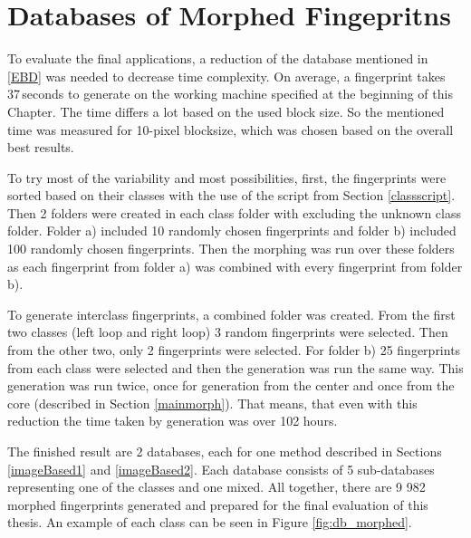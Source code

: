 \section{Databases of Morphed Fingepritns}
\label{database_morphed}
To evaluate the final applications, a reduction of the database mentioned in \ref{EBD} was needed to decrease time complexity. On average, a fingerprint takes 37\,seconds to generate on the working machine specified at the beginning of this Chapter. The time differs a lot based on the used block size. So the mentioned time was measured for 10-pixel blocksize, which was chosen based on the overall best results.

To try most of the variability and most possibilities, first, the fingerprints were sorted based on their classes with the use of the script from Section \ref{classscript}. Then 2 folders were created in each class folder with excluding the unknown class folder. Folder a) included 10 randomly chosen fingerprints and folder b) included 100 randomly chosen fingerprints. Then the morphing was run over these folders as each fingerprint from folder a) was combined with every fingerprint from folder b).

To generate interclass fingerprints, a combined folder was created. From the first two classes (left loop and right loop) 3 random fingerprints were selected. Then from the other two, only 2 fingerprints were selected. For folder b) 25 fingerprints from each class were selected and then the generation was run the same way. This generation was run twice, once for generation from the center and once from the core (described in Section \ref{mainmorph}). That means, that even with this reduction the time taken by generation was over 102 hours.

The finished result are 2 databases, each for one method described in Sections \ref{imageBased1} and \ref{imageBased2}. Each database consists of 5 sub-databases representing one of the classes and one mixed. All together, there are 9 982 morphed fingerprints generated and prepared for the final evaluation of this thesis. An example of each class can be seen in Figure \ref{fig:db_morphed}.

